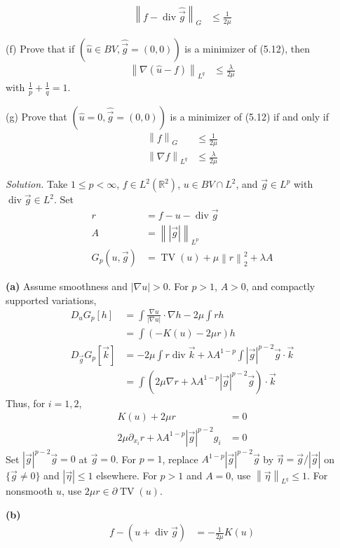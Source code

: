 \documentclass[12pt,letterpaper]{article}
\newcommand{\R}{\mathbb R}
\newcommand{\TV}{\operatorname{TV}}
\newcommand{\diver}{\operatorname{div}}
\newcommand{\norm}[1]{\left\lVert #1\right\rVert}
\newenvironment{statement}{\itshape\ignorespaces}{\par}
\newcommand{\solution}{\par\medskip\noindent\textit{Solution.}\enspace}
\newcommand{\partlabel}[1]{\par\medskip\noindent\textbf{(#1)}\enspace}
\begin{document}
\begin{statement}
\begin{align*}
 \norm{f-\diver\hat{\vec g}}_G&\leq\frac1{2\mu}
\end{align*}
\par\smallskip
(f) Prove that if $(\hat u\in BV,\hat{\vec g}=(0,0))$ is a minimizer
of (5.12), then
\begin{align*}
 \norm{\nabla(\hat u-f)}_{L^q}&\leq\frac\lambda{2\mu}
\end{align*}
with $\frac1p+\frac1q=1$.
\par\smallskip
(g) Prove that $(\hat u=0,\hat{\vec g}=(0,0))$ is a minimizer of
(5.12) if and only if
\begin{align*}
 \norm f_G&\leq\frac1{2\mu}\\
 \norm{\nabla f}_{L^q}&\leq\frac\lambda{2\mu}
\end{align*}
\end{statement}

\solution
Take $1\leq p<\infty$, $f\in L^2(\R^2)$, $u\in BV\cap L^2$,
and $\vec g\in L^p$ with $\diver\vec g\in L^2$. Set
\begin{align*}
 r&=f-u-\diver\vec g\\
 A&=\norm{|\vec g|}_{L^p}\\
 G_p(u,\vec g)&=\TV(u)+\mu\norm r_2^2+\lambda A
\end{align*}

\partlabel{a}
Assume smoothness and $|\nabla u|>0$. For $p>1$, $A>0$, and
compactly supported variations,
\begin{align*}
 D_uG_p[h]
 &=\int\frac{\nabla u}{|\nabla u|}\cdot\nabla h-2\mu\int rh\\
 &=\int(-K(u)-2\mu r)h\\
 D_{\vec g}G_p[\vec k]
 &=-2\mu\int r\diver\vec k
   +\lambda A^{1-p}\int|\vec g|^{p-2}\vec g\cdot\vec k\\
 &=\int\left(2\mu\nabla r
       +\lambda A^{1-p}|\vec g|^{p-2}\vec g\right)\cdot\vec k
\end{align*}
Thus, for $i=1,2$,
\begin{align*}
 K(u)+2\mu r&=0\\
 2\mu\partial_{x_i}r
   +\lambda A^{1-p}|\vec g|^{p-2}g_i&=0
\end{align*}
Set $|\vec g|^{p-2}\vec g=0$ at $\vec g=0$. For $p=1$, replace
$A^{1-p}|\vec g|^{p-2}\vec g$ by $\vec\eta=\vec g/|\vec g|$
on $\{\vec g\ne0\}$ and $|\vec\eta|\leq1$ elsewhere.
For $p>1$ and $A=0$, use $\norm{\vec\eta}_{L^q}\leq1$.
For nonsmooth $u$, use $2\mu r\in\partial\TV(u)$.

\partlabel{b}
\begin{align*}
 f-(u+\diver\vec g)&=-\frac1{2\mu}K(u)
\end{align*}
\end{document}
